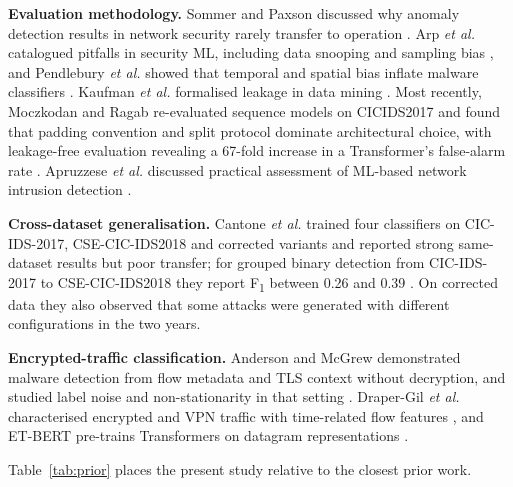\documentclass[conference]{IEEEtran}
\newcommand{\Fone}{F\textsubscript{1}}
\begin{document}
\textbf{Evaluation methodology.} Sommer and Paxson discussed why anomaly detection results in network security rarely transfer to operation \cite{sommer2010}. Arp \textit{et al.} catalogued pitfalls in security ML, including data snooping and sampling bias \cite{arp2022}, and Pendlebury \textit{et al.} showed that temporal and spatial bias inflate malware classifiers \cite{pendlebury2019}. Kaufman \textit{et al.} formalised leakage in data mining \cite{kaufman2012}. Most recently, Moczkodan and Ragab re-evaluated sequence models on CICIDS2017 and found that padding convention and split protocol dominate architectural choice, with leakage-free evaluation revealing a 67-fold increase in a Transformer's false-alarm rate \cite{moczkodan2026}. Apruzzese \textit{et al.} discussed practical assessment of ML-based network intrusion detection \cite{apruzzese2023}.

\textbf{Cross-dataset generalisation.} Cantone \textit{et al.} trained four classifiers on CIC-IDS-2017, CSE-CIC-IDS2018 and corrected variants and reported strong same-dataset results but poor transfer; for grouped binary detection from CIC-IDS-2017 to CSE-CIC-IDS2018 they report \Fone{} between 0.26 and 0.39 \cite{cantone2024}. On corrected data they also observed that some attacks were generated with different configurations in the two years.

\textbf{Encrypted-traffic classification.} Anderson and McGrew demonstrated malware detection from flow metadata and TLS context without decryption, and studied label noise and non-stationarity in that setting \cite{anderson2016,anderson2017}. Draper-Gil \textit{et al.} characterised encrypted and VPN traffic with time-related flow features \cite{drapergil2016}, and ET-BERT pre-trains Transformers on datagram representations \cite{lin2022}.

Table~\ref{tab:prior} places the present study relative to the closest prior work.
\end{document}
